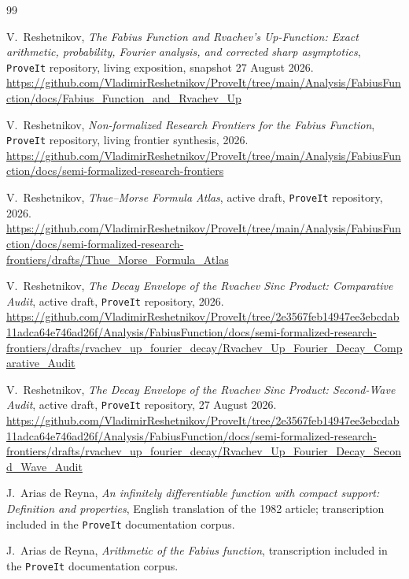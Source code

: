 \documentclass[11pt]{article}
\numberwithin{equation}{section}
\theoremstyle{definition}
\theoremstyle{remark}
\begin{document}
\begin{thebibliography}{99}

V.~Reshetnikov,
\emph{The Fabius Function and Rvachev's Up-Function: Exact arithmetic, probability,
Fourier analysis, and corrected sharp asymptotics},
\texttt{ProveIt} repository, living exposition, snapshot 27 August 2026.
\url{https://github.com/VladimirReshetnikov/ProveIt/tree/main/Analysis/FabiusFunction/docs/Fabius_Function_and_Rvachev_Up}

V.~Reshetnikov,
\emph{Non-formalized Research Frontiers for the Fabius Function},
\texttt{ProveIt} repository, living frontier synthesis, 2026.
\url{https://github.com/VladimirReshetnikov/ProveIt/tree/main/Analysis/FabiusFunction/docs/semi-formalized-research-frontiers}

V.~Reshetnikov,
\emph{Thue--Morse Formula Atlas}, active draft, \texttt{ProveIt} repository, 2026.
\url{https://github.com/VladimirReshetnikov/ProveIt/tree/main/Analysis/FabiusFunction/docs/semi-formalized-research-frontiers/drafts/Thue_Morse_Formula_Atlas}

V.~Reshetnikov,
\emph{The Decay Envelope of the Rvachev Sinc Product: Comparative Audit},
active draft, \texttt{ProveIt} repository, 2026.
\url{https://github.com/VladimirReshetnikov/ProveIt/tree/2e3567feb14947ee3ebcdab11adca64e746ad26f/Analysis/FabiusFunction/docs/semi-formalized-research-frontiers/drafts/rvachev_up_fourier_decay/Rvachev_Up_Fourier_Decay_Comparative_Audit}

V.~Reshetnikov,
\emph{The Decay Envelope of the Rvachev Sinc Product: Second-Wave Audit},
active draft, \texttt{ProveIt} repository, 27 August 2026.
\url{https://github.com/VladimirReshetnikov/ProveIt/tree/2e3567feb14947ee3ebcdab11adca64e746ad26f/Analysis/FabiusFunction/docs/semi-formalized-research-frontiers/drafts/rvachev_up_fourier_decay/Rvachev_Up_Fourier_Decay_Second_Wave_Audit}

J.~Arias de Reyna,
\emph{An infinitely differentiable function with compact support: Definition and
properties}, English translation of the 1982 article; transcription included in the
\texttt{ProveIt} documentation corpus.

J.~Arias de Reyna,
\emph{Arithmetic of the Fabius function}, transcription included in the
\texttt{ProveIt} documentation corpus.


\end{thebibliography}
\end{document}
